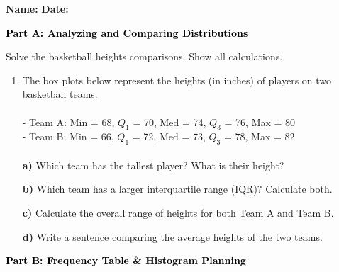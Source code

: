 \documentclass[12pt, letterpaper, fleqn]{article}
\begin{document}
\textbf{Name:} \underline{\hspace{5cm}}
\hfill
\textbf{Date:} \underline{\hspace{3cm}}\\

\begin{tcolorbox}[colback=black!10]
    \large\textcolor{black}{\textbf{Part A: Analyzing and Comparing Distributions}}
\end{tcolorbox}

\vspace{3mm}

\noindent
Solve the basketball heights comparisons. Show all calculations.

\vspace{5mm}

\begin{enumerate}[itemsep=2.2cm, leftmargin=0.6cm]
\item The box plots below represent the heights (in inches) of players on two basketball teams. \\ \\
- Team A: Min = 68, $Q_1$ = 70, Med = 74, $Q_3$ = 76, Max = 80 \\
- Team B: Min = 66, $Q_1$ = 72, Med = 73, $Q_3$ = 78, Max = 82 \\ \\
\textbf{a)} Which team has the tallest player? What is their height? \\

\vspace{2cm}

\textbf{b)} Which team has a larger interquartile range (IQR)? Calculate both. \\
\vspace{2cm}

\textbf{c)} Calculate the overall range of heights for both Team A and Team B. \\
\vspace{2cm}

\textbf{d)} Write a sentence comparing the average heights of the two teams. \\
\vspace{2cm}

\end{enumerate}

\newpage

\begin{tcolorbox}[colback=black!10]
    \large\textcolor{black}{\textbf{Part B: Frequency Table \& Histogram Planning}}
\end{tcolorbox}
\end{document}
